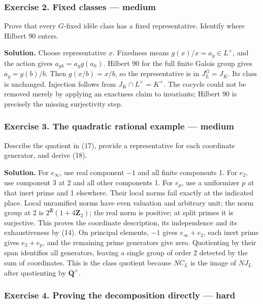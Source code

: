 \documentclass[11pt,a4paper]{article}
\begin{document}
\subsubsection{Exercise 2. Fixed classes ---
medium}\label{exercise-2.-fixed-classes-medium}

Prove that every \(G\)-fixed idèle class has a fixed representative.
Identify where Hilbert 90 enters.

\textbf{Solution.} Choose representative \(x\). Fixedness means
\(g(x)/x=a_g\in L^\times\), and the action gives \(a_{gh}=a_g g(a_h)\).
Hilbert 90 for the full finite Galois group gives \(a_g=g(b)/b\). Then
\(g(x/b)=x/b\), so the representative is in \(J_L^G=J_K\). Its class is
unchanged. Injection follows from \(J_K\cap L^\times=K^\times\). The
cocycle could not be removed merely by applying an exactness claim to
invariants; Hilbert 90 is precisely the missing surjectivity step.

\subsubsection{Exercise 3. The quadratic rational example ---
medium}\label{exercise-3.-the-quadratic-rational-example-medium}

Describe the quotient in (17), provide a representative for each
coordinate generator, and derive (18).

\textbf{Solution.} For \(e_\infty\), use real component \(-1\) and all
finite components 1. For \(e_2\), use component 3 at 2 and all other
components 1. For \(e_p\), use a uniformizer \(p\) at that inert prime
and 1 elsewhere. Their local norms fail exactly at the indicated place.
Local unramified norms have even valuation and arbitrary unit; the norm
group at 2 is \(2^{\mathbf Z}(1+4\mathbf Z_2)\); the real norm is
positive; at split primes it is surjective. This proves the coordinate
description, its independence and its exhaustiveness by (14). On
principal elements, \(-1\) gives \(e_\infty+e_2\), each inert prime
gives \(e_2+e_p\), and the remaining prime generators give zero.
Quotienting by their span identifies all generators, leaving a single
group of order 2 detected by the sum of coordinates. This is the class
quotient because \(N C_L\) is the image of \(N J_L\) after quotienting
by \(\mathbf Q^\times\).

\subsubsection{Exercise 4. Proving the decomposition directly ---
hard}\label{exercise-4.-proving-the-decomposition-directly-hard}
\end{document}
